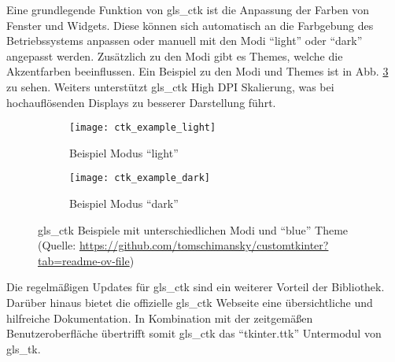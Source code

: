 Eine grundlegende Funktion von \gls{gls_ctk} ist die Anpassung der Farben von Fenster und Widgets. Diese können sich automatisch an die Farbgebung des Betriebssystems anpassen oder manuell mit den Modi \enquote{light} oder \enquote{dark} angepasst werden. Zusätzlich zu den Modi gibt es Themes, welche die Akzentfarben beeinflussen. Ein Beispiel zu den Modi und Themes ist in Abb. \ref{fig:ctk_bsp} zu sehen. Weiters unterstützt \gls{gls_ctk} High DPI Skalierung, was bei hochauflösenden Displays zu besserer Darstellung führt. \cite[vgl.][]{Schimansky_Git:o.J.}

\begin{figure}[H]
	\centering
	\begin{subfigure}[t]{0.90\textwidth}
		\centering
		\texttt{[image: ctk\_example\_light]}
		\caption{Beispiel Modus \enquote{light} \label{fig:ctk_light}}
	\end{subfigure}
	\begin{subfigure}[t]{0.90\textwidth}
		\centering
		\texttt{[image: ctk\_example\_dark]}
		\caption{Beispiel Modus \enquote{dark} \label{fig:ctk_dark}}
	\end{subfigure}
	\caption{\gls{gls_ctk} Beispiele mit unterschiedlichen Modi und \enquote{blue} Theme  (Quelle: \url{https://github.com/tomschimansky/customtkinter?tab=readme-ov-file})    \label{fig:ctk_bsp}}
\end{figure}

Die regelmäßigen Updates für \gls{gls_ctk} sind ein weiterer Vorteil der Bibliothek. Darüber hinaus bietet die offizielle \gls{gls_ctk} Webseite eine übersichtliche und hilfreiche Dokumentation. In Kombination mit der zeitgemäßen Benutzeroberfläche übertrifft somit \gls{gls_ctk} das \enquote{tkinter.ttk} Untermodul von \gls{gls_tk}.


